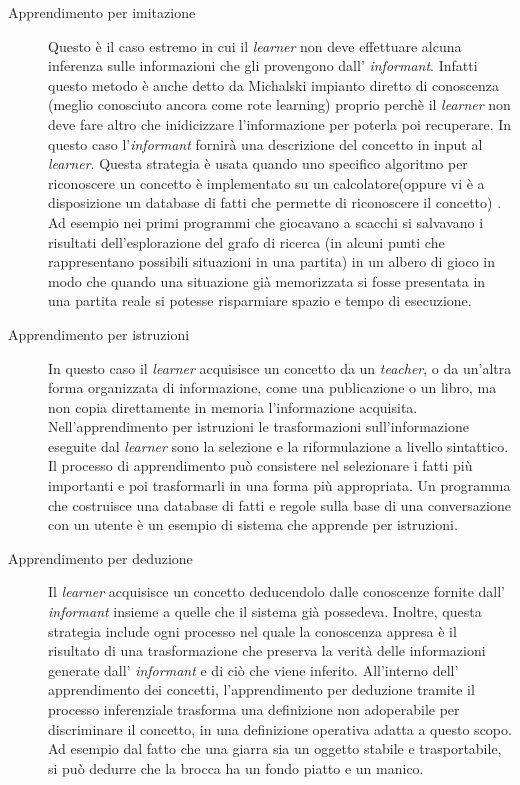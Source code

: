 \begin{description}
\item[Apprendimento per imitazione] Questo è il caso estremo in cui il \textit{learner} non deve effettuare alcuna inferenza sulle informazioni che gli provengono dall' \textit{informant}. Infatti questo metodo è anche detto da Michalski impianto diretto di conoscenza (meglio conosciuto ancora come rote learning) proprio perchè il \textit{learner} non deve fare altro che inidicizzare l'informazione per poterla poi recuperare. In questo caso l'\textit{informant} fornirà una descrizione del concetto in input al \textit{learner}. Questa strategia è usata quando uno specifico algoritmo per riconoscere un concetto è implementato su un calcolatore(oppure vi è a disposizione un database di fatti che permette di riconoscere il concetto) . Ad esempio nei primi programmi che giocavano a scacchi si salvavano i risultati dell'esplorazione del grafo di  ricerca (in alcuni punti che rappresentano possibili situazioni in una partita) in un albero di gioco in modo che quando una situazione già memorizzata si fosse presentata in una partita reale si potesse risparmiare spazio e tempo di esecuzione.
\item[Apprendimento per istruzioni]In questo caso il \textit{learner} acquisisce un concetto da un \textit{teacher}, o da un’altra forma organizzata di informazione, come una publicazione o un libro, ma non copia direttamente in memoria l’informazione acquisita. Nell’apprendimento per istruzioni le trasformazioni sull’informazione eseguite dal \textit{learner} sono la selezione e la riformulazione a livello sintattico. Il processo di apprendimento può consistere
nel selezionare i fatti più importanti e poi trasformarli in una forma più appropriata. Un programma che costruisce una database di fatti e
regole sulla base di una conversazione con un utente è un esempio di sistema che apprende per istruzioni.
\item[Apprendimento per deduzione]Il \textit{learner} acquisisce un concetto deducendolo dalle conoscenze fornite dall' \textit{informant} insieme a quelle che il sistema già possedeva. Inoltre, questa strategia include ogni processo nel quale la conoscenza appresa è il risultato di una trasformazione che preserva la verità delle informazioni generate dall' \textit{informant} e di ciò che viene inferito. All’interno dell' apprendimento dei concetti, l’apprendimento per deduzione tramite il processo inferenziale trasforma una definizione non adoperabile per discriminare il concetto, in una definizione operativa adatta a questo scopo. Ad esempio dal fatto che una giarra sia un oggetto stabile e trasportabile, si può dedurre che la brocca ha un fondo piatto e un manico.

\end{description}
